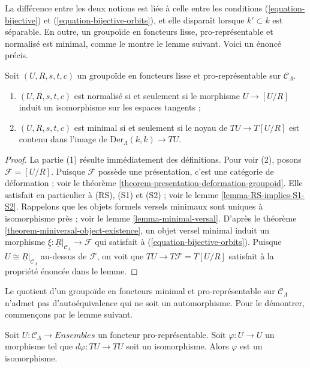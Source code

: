 \noindent
La différence entre les deux notions est liée à celle entre les conditions
(\ref{equation-bijective}) et (\ref{equation-bijective-orbits}), et elle
disparaît lorsque $k' \subset k$ est séparable. En outre, un groupoïde en foncteurs
lisse, pro-représentable et normalisé est minimal, comme le montre le lemme
suivant. Voici un énoncé précis.

\begin{lemma}
\label{lemma-characterize-minimal-groupoid-in-functors}
Soit $(U, R, s, t, c)$ un groupoïde en foncteurs lisse et pro-représentable sur
$\mathcal{C}_\Lambda$.
\begin{enumerate}
\item $(U, R, s, t, c)$ est normalisé si et seulement si le morphisme
$U \to [U/R]$ induit un isomorphisme sur les espaces tangents ;
\item $(U, R, s, t, c)$ est minimal si et seulement si le noyau de
$TU \to T[U/R]$ est contenu dans l'image de
$\text{Der}_\Lambda(k, k) \to TU$.
\end{enumerate}
\end{lemma}

\begin{proof}
La partie (1) résulte immédiatement des définitions. Pour voir (2), posons
$\mathcal{F} = [U/R]$. Puisque $\mathcal{F}$ possède une présentation, c'est
une catégorie de déformation ; voir le théorème
\ref{theorem-presentation-deformation-groupoid}. Elle satisfait en particulier
à (RS), (S1) et (S2) ; voir le lemme \ref{lemma-RS-implies-S1-S2}. Rappelons
que les objets formels versels minimaux sont uniques à isomorphisme près ; voir
le lemme \ref{lemma-minimal-versal}. D'après le théorème
\ref{theorem-miniversal-object-existence}, un objet versel minimal induit un
morphisme
$\underline{\xi} : \underline{R}|_{\mathcal{C}_\Lambda} \to \mathcal{F}$
qui satisfait à (\ref{equation-bijective-orbits}). Puisque
$U \cong \underline{R}|_{\mathcal{C}_\Lambda}$ au-dessus de $\mathcal{F}$, on
voit que $TU \to T\mathcal{F} = T[U/R]$ satisfait à la propriété énoncée dans
le lemme.
\end{proof}

\noindent
Le quotient d'un groupoïde en foncteurs minimal et pro-représentable sur $\mathcal
C_\Lambda$ n'admet pas d'autoéquivalence qui ne soit un automorphisme. Pour le
démontrer, commençons par le lemme suivant.

\begin{lemma}
\label{lemma-surjective-morphism-prorepresentable-functor}
Soit $U: \mathcal{C}_\Lambda \to \textit{Ensembles}$ un foncteur
pro-représentable. Soit $\varphi : U \to U$ un morphisme tel que
$d\varphi : TU \to TU$ soit un isomorphisme. Alors $\varphi$ est un
isomorphisme.
\end{lemma}

